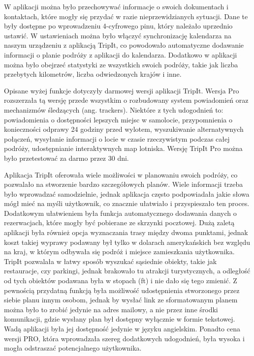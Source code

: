 \documentclass[10pt,twoside,a4paper]{report}
\begin{document}
\par W aplikacji można było przechowywać informacje o swoich dokumentach i kontaktach, które mogły się przydać w razie nieprzewidzianych sytuacji. Dane te były dostępne po wprowadzeniu 4-cyfrowego pinu, który należało uprzednio ustawić. W ustawieniach można było włączyć synchronizację kalendarza na naszym urządzeniu z aplikacją TripIt, co powodowało automatyczne dodawanie informacji o planie podróży z aplikacji do kalendarza. Dodatkowo w aplikacji można było obejrzeć statystyki ze wszystkich swoich podróży, takie jak liczba przebytych kilometrów, liczba odwiedzonych krajów i inne.

\par Opisane wyżej funkcje dotyczyły darmowej wersji aplikacji TripIt. Wersja Pro rozszerzała tą wersję przede wszystkim o rozbudowany system powiadomień oraz mechanizmów śledzących (ang. trackers). Niektóre z tych udogodnień to: powiadomienia o dostępności lepszych miejsc w samolocie, przypomnienia o konieczności odprawy 24 godziny przed wylotem, wyszukiwanie alternatywnych połączeń, wysyłanie informacji o locie w czasie rzeczywistym podczas całej podróży, udostępnianie interaktywnych map lotniska. Wersję TripIt Pro można było przetestować za darmo przez 30 dni.

\par Aplikacja TripIt oferowała wiele możliwości w planowaniu swoich podróży, co pozwalało na stworzenie bardzo szczegółowych planów. Wiele informacji trzeba było wprowadzać samodzielnie, jednak aplikacja często podpowiadała jakie słowa mógł mieć na myśli użytkownik, co znacznie ułatwiało i przyspieszało ten proces. Dodatkowym ułatwieniem była funkcja automatycznego dodawania danych o rezerwacjach, które mogły być pobierane ze skrzynki pocztowej. Dużą zaletą aplikacji była również opcja wyznaczania trasy między dwoma punktami, jednak koszt takiej wyprawy podawany był tylko w dolarach amerykańskich bez względu na kraj, w którym odbywała się podróż i miejsce zamieszkania użytkownika. TripIt pozwalała w łatwy sposób wyszukać sąsiednie obiekty, takie jak restauracje, czy parkingi, jednak brakowało tu atrakcji turystycznych, a odległość od tych obiektów podawana była w stopach (ft) i nie dało się tego zmienić. Z pewnością przydatną funkcją była możliwość udostępnienia stworzonego przez siebie planu innym osobom, jednak by wysłać link ze sformatowanym planem można było to zrobić jedynie na adres mailowy, a nie przez inne środki komunikacji, gdzie wysłany plan był dostępny wyłącznie w formie tekstowej. Wadą aplikacji była jej dostępność jedynie w języku angielskim. Ponadto cena wersji PRO, która wprowadzała szereg dodatkowych udogodnień, była wysoka i mogła odstraszać potencjalnego użytkownika.
\end{document}
